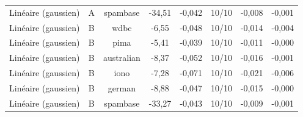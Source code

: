 \begin{table}[tbp]
{\begin{tabular}{lccccccc}
Linéaire (gaussien) & A & spambase & -34,51 & -0,042 & 10/10 & -0,008 & -0,001 \\
Linéaire (gaussien) & B & wdbc & -6,55 & -0,048 & 10/10 & -0,014 & -0,004 \\
Linéaire (gaussien) & B & pima & -5,41 & -0,039 & 10/10 & -0,011 & -0,000 \\
Linéaire (gaussien) & B & australian & -8,37 & -0,052 & 10/10 & -0,016 & -0,001 \\
Linéaire (gaussien) & B & iono & -7,28 & -0,071 & 10/10 & -0,021 & -0,006 \\
Linéaire (gaussien) & B & german & -8,88 & -0,047 & 10/10 & -0,015 & -0,000 \\
Linéaire (gaussien) & B & spambase & -33,27 & -0,043 & 10/10 & -0,009 & -0,001 \\
\bottomrule
\end{tabular}
}
\end{table}
